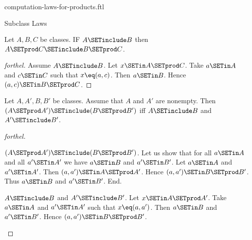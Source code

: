 \documentclass{naproche-library}
\begin{document}
\begin{smodule}[title=Computation Laws for Cartesian Products]{computation-laws-for-products.ftl}

\begin{sfragment}{Subclass Laws}
  \begin{proposition}[forthel,id=FOUNDATIONS_05_5719644021194752]
    Let $A, B, C$ be classes.
    IF $A \SETinclude B$ then $A \SETprod C \SETinclude B \SETprod C$.
  \end{proposition}
  \begin{proof}[forthel]
    Assume $A \SETinclude B$.
    Let $x \SETin A \SETprod C$.
    Take $a \SETin A$ and $c \SETin C$ such that $x \eq (a, c)$.
    Then $a \SETin B$.
    Hence $(a, c) \SETin B \SETprod C$.
  \end{proof}

  \begin{proposition}[forthel,id=FOUNDATIONS_05_4888282951319552]
    Let $A, A', B, B'$ be classes.
    Assume that $A$ and $A'$ are nonempty.
    Then $(A \SETprod A') \SETinclude (B \SETprod B')$ iff $A \SETinclude B$ and $A' \SETinclude B'$.
  \end{proposition}
  \begin{proof}[forthel]
    \begin{case}{$(A \SETprod A') \SETinclude (B \SETprod B')$.}
      Let us show that for all $a \SETin A$ and all $a' \SETin A'$ we have $a \SETin B$ and $a' \SETin B'$.
        Let $a \SETin A$ and $a' \SETin A'$.
        Then $(a, a') \SETin A \SETprod A'$.
        Hence $(a, a') \SETin B \SETprod B'$.
        Thus $a \SETin B$ and $a' \SETin B'$.
      End.
    \end{case}

    \begin{case}{$A \SETinclude B$ and $A' \SETinclude B'$.}
      Let $x \SETin A \SETprod A'$.
      Take $a \SETin A$ and $a' \SETin A'$ such that $x \eq (a, a')$.
      Then $a \SETin B$ and $a' \SETin B'$.
      Hence $(a, a') \SETin B \SETprod B'$.
    \end{case}
  \end{proof}
\end{sfragment}


\end{smodule}
\end{document}
